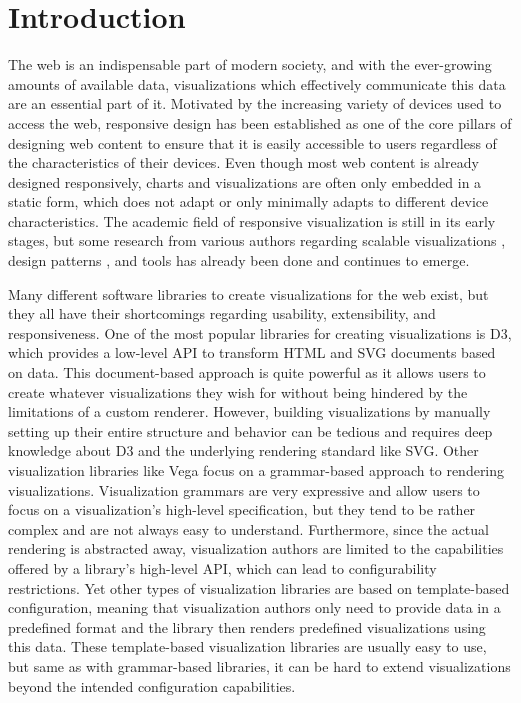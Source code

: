 \chapter{Introduction}
\label{chap:Introduction}

The web is an indispensable part of modern society, and with the
ever-growing amounts of available data, visualizations which
effectively communicate this data are an essential part of it.
Motivated by the increasing variety of devices used to access the web,
responsive design has been established as one of the core pillars of
designing web content to ensure that it is easily accessible to users
regardless of the characteristics of their devices. Even though most
web content is already designed responsively, charts and
visualizations are often only embedded in a static form, which does
not adapt or only minimally adapts to different device
characteristics. The academic field of responsive visualization is
still in its early stages, but some research from various authors
regarding scalable visualizations
\parencite{BuildingRespDataVisForTheWeb,LearningRespDataVis}, design
patterns \parencite{RespVis,TechniquesForFlexibleRespVisDesign,
  DesignPatternsTradeOffsRespVis}, and tools
\parencite{TechniquesForFlexibleRespVisDesign,Cicero} has already been
done and continues to emerge.

Many different software libraries to create visualizations for the web
exist, but they all have their shortcomings regarding usability,
extensibility, and responsiveness.  One of the most popular libraries
for creating visualizations is D3, which provides a low-level API to
transform HTML and SVG documents based on data.  This document-based
approach is quite powerful as it allows users to create whatever
visualizations they wish for without being hindered by the limitations
of a custom renderer.  However, building visualizations by manually
setting up their entire structure and behavior can be tedious and
requires deep knowledge about D3 and the underlying rendering standard
like SVG.  Other visualization libraries like Vega \parencite{Vega}
focus on a grammar-based approach to rendering visualizations.
Visualization grammars are very expressive and allow users to focus on
a visualization's high-level specification, but they tend to be rather
complex and are not always easy to understand.  Furthermore, since the
actual rendering is abstracted away, visualization authors are limited
to the capabilities offered by a library's high-level API, which can
lead to configurability restrictions.  Yet other types of
visualization libraries are based on template-based configuration,
meaning that visualization authors only need to provide data in a
predefined format and the library then renders predefined
visualizations using this data.  These template-based visualization
libraries are usually easy to use, but same as with grammar-based
libraries, it can be hard to extend visualizations beyond the intended
configuration capabilities.

